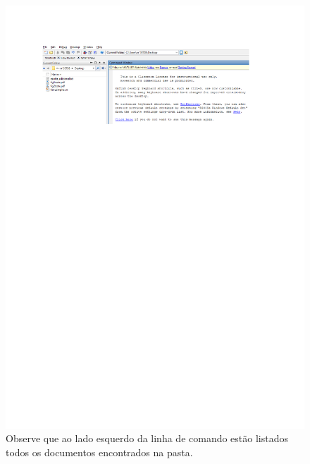 \documentclass[10pt]{article}
\begin{document}
\begin{figure}[H]
    \centering
    \includegraphics[scale = 0.7]{fig4teste.pdf}
    \caption{Observe que ao lado esquerdo da linha de comando estão listados todos os documentos encontrados na pasta.}
\end{figure}
\end{document}
